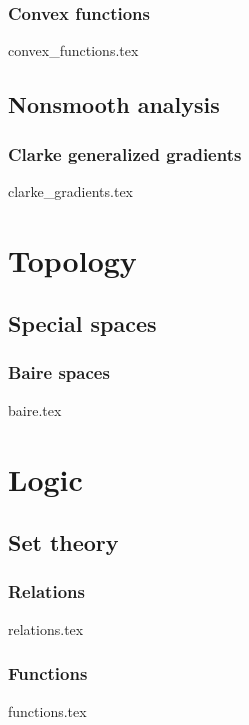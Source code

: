 \documentclass[numbers=endperiod, bibliography=totocnumbered]{scrartcl}
\begin{document}
\subsubsection{Convex functions}\label{sec:convex_functions}
{convex_functions.tex}

\subsection{Nonsmooth analysis}\label{sec:nonsmooth_analysis}
\subsubsection{Clarke generalized gradients}\label{sec:clarke_gradients}
{clarke_gradients.tex}

\section{Topology}\label{sec:topology}
\subsection{Special spaces}\label{sec:topology/special_spaces}
\subsubsection{Baire spaces}\label{sec:baire_spaces}
{baire.tex}

\section{Logic}\label{sec:logic}
\subsection{Set theory}\label{sec:sets}
\subsubsection{Relations}\label{sec:relations}
{relations.tex}
\subsubsection{Functions}\label{sec:functions}
{functions.tex}

\printbibliography
\end{document}
